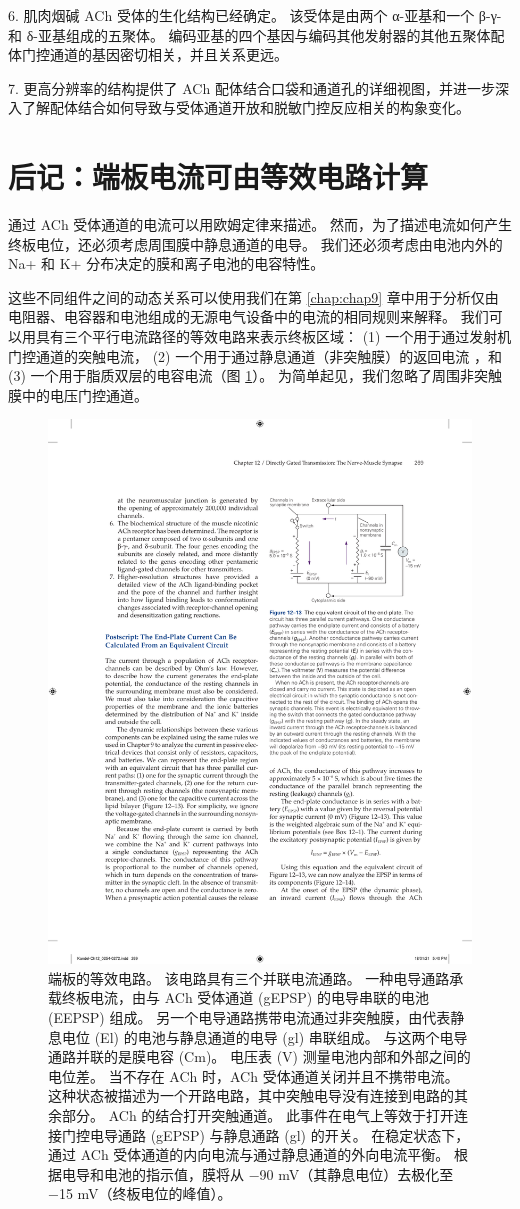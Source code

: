 6. 肌肉烟碱 ACh 受体的生化结构已经确定。 
该受体是由两个 α-亚基和一个 β-γ-和 δ-亚基组成的五聚体。 
编码亚基的四个基因与编码其他发射器的其他五聚体配体门控通道的基因密切相关，并且关系更远。 


7. 更高分辨率的结构提供了 ACh 配体结合口袋和通道孔的详细视图，并进一步深入了解配体结合如何导致与受体通道开放和脱敏门控反应相关的构象变化。


\section{后记：端板电流可由等效电路计算}

通过 ACh 受体通道的电流可以用欧姆定律来描述。 
然而，为了描述电流如何产生终板电位，还必须考虑周围膜中静息通道的电导。 
我们还必须考虑由电池内外的 Na+ 和 K+ 分布决定的膜和离子电池的电容特性。


这些不同组件之间的动态关系可以使用我们在第 \ref{chap:chap9} 章中用于分析仅由电阻器、电容器和电池组成的无源电气设备中的电流的相同规则来解释。
我们可以用具有三个平行电流路径的等效电路来表示终板区域：
(1) 一个用于通过发射机门控通道的突触电流，
(2) 一个用于通过静息通道（非突触膜）的返回电流 ，和 
(3) 一个用于脂质双层的电容电流（图 \ref{fig:12_13}）。 
为简单起见，我们忽略了周围非突触膜中的电压门控通道。

\begin{figure}[htbp]
	\centering
	\includegraphics[width=0.5\linewidth]{chap12/fig_12_13}
	\caption{端板的等效电路。 该电路具有三个并联电流通路。 一种电导通路承载终板电流，由与 ACh 受体通道 (gEPSP) 的电导串联的电池 (EEPSP) 组成。 另一个电导通路携带电流通过非突触膜，由代表静息电位 (El) 的电池与静息通道的电导 (gl) 串联组成。 与这两个电导通路并联的是膜电容 (Cm)。 电压表 (V) 测量电池内部和外部之间的电位差。 当不存在 ACh 时，ACh 受体通道关闭并且不携带电流。 这种状态被描述为一个开路电路，其中突触电导没有连接到电路的其余部分。 ACh 的结合打开突触通道。 此事件在电气上等效于打开连接门控电导通路 (gEPSP) 与静息通路 (gl) 的开关。 在稳定状态下，通过 ACh 受体通道的内向电流与通过静息通道的外向电流平衡。 根据电导和电池的指示值，膜将从 −90 mV（其静息电位）去极化至 −15 mV（终板电位的峰值）。}
	\label{fig:12_13}
\end{figure}


